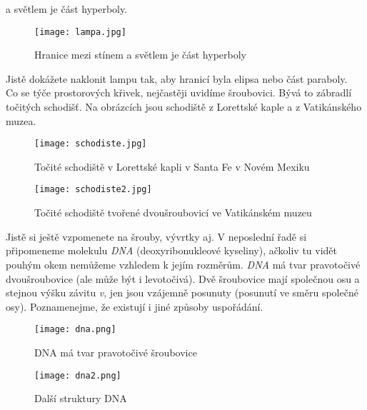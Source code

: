 a světlem je část hyperboly.
\begin{figure}[H]
	\centering
	\texttt{[image: lampa.jpg]}
	\caption{Hranice mezi stínem a světlem je část hyperboly}
	\label{overflow}
\end{figure}
Jistě dokážete naklonit lampu tak, aby hranicí byla elipsa nebo část paraboly. \\[5pt]
Co se týče prostorových křivek, nejčastěji uvidíme šroubovici. Bývá to zábradlí točitých schodišť.
Na obrázcích jsou schodiště z Lorettské kaple a z Vatikánského muzea.
\begin{figure}[H]
	\centering
	\texttt{[image: schodiste.jpg]}
	\caption{Točité schodiště v Lorettské kapli v Santa Fe v Novém Mexiku}
	\label{overflow}
\end{figure}
\begin{figure}[H]
	\centering
	\texttt{[image: schodiste2.jpg]}
	\caption{Točité schodiště tvořené dvoušroubovicí ve Vatikánském muzeu}
	\label{overflow}
\end{figure}
Jistě si ještě vzpomenete na šrouby, vývrtky aj. V neposlední řadě si připomeneme molekulu \textit{DNA}
(deoxyribonukleové kyseliny), ačkoliv tu vidět pouhým okem nemůžeme vzhledem k jejím rozměrům. \textit{DNA}
má tvar pravotočivé dvoušroubovice (ale může být i levotočivá). Dvě šroubovice mají společnou osu a stejnou výšku
závitu \textit{v}, jen jsou vzájemně posunuty (posunutí ve směru společné osy). Poznamenejme, že existují i jiné
způsoby uspořádání.
\begin{figure}[H]
	\centering
	\texttt{[image: dna.png]}
	\caption{DNA má tvar pravotočivé šroubovice}
	\label{overflow}
\end{figure}
\begin{figure}[H]
	\centering
	\texttt{[image: dna2.png]}
	\caption{Další struktury DNA}
	\label{overflow}
\end{figure}